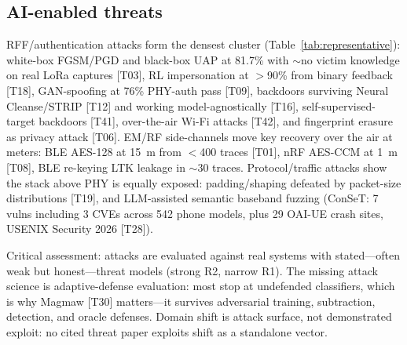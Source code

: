 \subsection{AI-enabled threats}
\label{sec:threat}
RFF/authentication attacks form the densest cluster (Table~\ref{tab:representative}): white-box FGSM/PGD and black-box UAP at 81.7\% with $\sim$no victim knowledge on real LoRa captures [T03], RL impersonation at $>$90\% from binary feedback [T18], GAN-spoofing at 76\% PHY-auth pass [T09], backdoors surviving Neural Cleanse/STRIP [T12] and working model-agnostically [T16], self-supervised-target backdoors [T41], over-the-air Wi-Fi attacks [T42], and fingerprint erasure as privacy attack [T06]. EM/RF side-channels move key recovery over the air at meters: BLE AES-128 at 15~m from $<$400 traces [T01], nRF AES-CCM at 1~m [T08], BLE re-keying LTK leakage in $\sim$30 traces. Protocol/traffic attacks show the stack above PHY is equally exposed: padding/shaping defeated by packet-size distributions [T19], and LLM-assisted semantic baseband fuzzing (ConSeT: 7 vulns including 3 CVEs across 542 phone models, plus 29 OAI-UE crash sites, USENIX Security 2026 [T28]).

Critical assessment: attacks are evaluated against real systems with stated---often weak but honest---threat models (strong R2, narrow R1). The missing attack science is adaptive-defense evaluation: most stop at undefended classifiers, which is why Magmaw [T30] matters---it survives adversarial training, subtraction, detection, and oracle defenses. Domain shift is attack surface, not demonstrated exploit: no cited threat paper exploits shift as a standalone vector.

